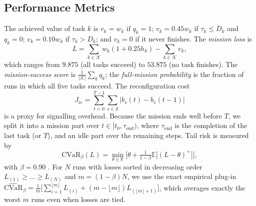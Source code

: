 \documentclass[conference]{IEEEtran}
\begin{document}
\subsection{Performance Metrics}
The achieved value of task $k$ is $v_k=w_k$ if $q_k=1$; $v_k=0.45w_k$ if $\tau_k\le D_k$ and $q_k=0$; $v_k=0.10w_k$ if $\tau_k>D_k$; and $v_k=0$ if it never finishes. The \emph{mission loss} is
\begin{equation}
L=\sum_{k\in\mathcal{K}} w_k(1+0.25h_k) - \sum_{k\in\mathcal{K}} v_k,
\label{eq:loss}
\end{equation}
which ranges from $9.875$ (all tasks succeed) to $53.875$ (no task finishes). The \emph{mission-success score} is $\frac{1}{|\mathcal{K}|}\sum_k q_k$; the \emph{full-mission probability} is the fraction of runs in which all five tasks succeed. The reconfiguration cost
\begin{equation}
J_{\mathrm{rc}}=\sum_{t=0}^{T-1}\sum_{s\in\mathcal{S}}\big|b_s(t)-b_s(t-1)\big|
\label{eq:reconfig}
\end{equation}
is a proxy for signalling overhead. Because the mission ends well before $T$, we split it into a mission part over $t\in[t_0,\tau_{\mathrm{end}})$, where $\tau_{\mathrm{end}}$ is the completion of the last task (or $T$), and an idle part over the remaining steps. Tail risk is measured by
\begin{equation}
\mathrm{CVaR}_{\beta}(L)=\min_{\theta\in\mathbb{R}}\Big[\theta+\tfrac{1}{1-\beta}\mathbb{E}\big[(L-\theta)^+\big]\Big],
\label{eq:cvar}
\end{equation}
with $\beta=0.90$ \cite{cvar}. For $N$ runs with losses sorted in decreasing order $L_{(1)}\ge\dots\ge L_{(N)}$ and $m=(1-\beta)N$, we use the exact empirical plug-in
$\widehat{\mathrm{CVaR}}_\beta=\frac{1}{m}\big[\sum_{i=1}^{\lfloor m\rfloor}L_{(i)}+(m-\lfloor m\rfloor)L_{(\lfloor m\rfloor+1)}\big]$,
which averages exactly the worst $m$ runs even when losses are tied.
\end{document}
